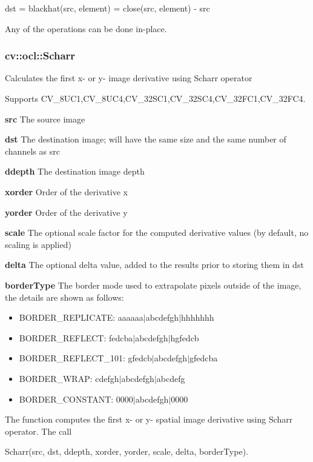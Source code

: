\documentclass{article}
\begin{document}
\begin{center}
dst = blackhat(src, element) = close(src, element) - src
\end{center}

Any of the operations can be done in-place.

\newpage

\subsubsection{cv::ocl::Scharr}
\label{subsubsec:mylabel42}
Calculates the first x- or y- image derivative using Scharr operator

Supports CV{\_}8UC1,CV{\_}8UC4,CV{\_}32SC1,CV{\_}32SC4,CV{\_}32FC1,CV{\_}32FC4.

\textbf{src }The source image

\textbf{dst }The destination image; will have the same size and the same
number of channels as src

\textbf{ddepth }The destination image depth

\textbf{xorder }Order of the derivative x

\textbf{yorder }Order of the derivative y

\textbf{scale }The optional scale factor for the computed derivative values
(by default, no scaling is applied)

\textbf{delta }The optional delta value, added to the results prior to
storing them in dst

\textbf{borderType }The border mode used to extrapolate pixels outside of
the image, the details are shown as follows:

\begin{itemize}
\item BORDER{\_}REPLICATE: aaaaaa$\vert $abcdefgh$\vert $hhhhhhh
\item BORDER{\_}REFLECT: fedcba$\vert $abcdefgh$\vert $hgfedcb
\item BORDER{\_}REFLECT{\_}101: gfedcb$\vert $abcdefgh$\vert $gfedcba
\item BORDER{\_}WRAP: cdefgh$\vert $abcdefgh$\vert $abcdefg
\item BORDER{\_}CONSTANT: 0000$\vert $abcdefgh$\vert $0000
\end{itemize}

The function computes the first x- or y- spatial image derivative using
Scharr operator. The call

\begin{center}
Scharr(src, dst, ddepth, xorder, yorder, scale, delta, borderType).
\end{center}
\end{document}
